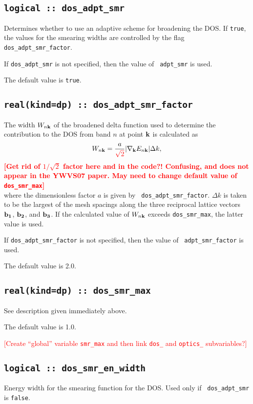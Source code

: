 \subsection[dos\_adpt\_smr]{\tt logical :: dos\_adpt\_smr}
Determines whether to use an adaptive scheme for broadening the
DOS. If \verb#true#, the values for the smearing widths are 
controlled by the flag {\tt dos\_adpt\_smr\_factor}.

If {\tt dos\_adpt\_smr} is not specified, then the value of {\tt
  adpt\_smr} is used.  

The default value is \verb#true#.


\subsection[dos\_adpt\_smr\_factor]{\tt real(kind=dp) :: dos\_adpt\_smr\_factor}

The width $W_{n{\bf k}}$ of the broadened delta function used to
determine the contribution to the DOS from band $n$ at point ${\bf k}$
is calculated as
%
$$
W_{n{\bf k}}=\frac{a}{\textcolor{red}{\sqrt{2}}}\vert
\nabla_{\bf k} E_{n{\bf k}}\vert \Delta k,
$$ 
%
\textcolor{red}{{\bf [Get rid of $1/\sqrt{2}$ factor here and in the code?! 
Confusing, and does not appear in the YWVS07 paper. May need to change default value of
{\tt dos\_smr\_max}]}}\\
where the dimensionless factor $a$ is given by {\tt
  dos\_adpt\_smr\_factor}. $\Delta k$ is taken to be the largest of
the mesh spacings along the three reciprocal lattice vectors ${\bf
  b_1}$, ${\bf b_2}$, and ${\bf b_3}$.  If the calculated value of
$W_{n{\bf k}}$ exceeds {\tt dos\_smr\_max}, the latter
value is used.

If {\tt dos\_adpt\_smr\_factor} is not specified, then the value of {\tt
  adpt\_smr\_factor} is used.  

The default value is 2.0.


\subsection[dos\_smr\_max]{\tt real(kind=dp) ::
  dos\_smr\_max}

See description given immediately above.

The default value is 1.0.

\textcolor{red}{[Create ``global'' variable {\tt smr\_max} and then link
{\tt dos\_} and {\tt optics\_} subvariables?]}

\subsection[dos\_smr\_en\_width]{\tt logical :: dos\_smr\_en\_width}
Energy width for the smearing function for the DOS. Used only if {\tt
  dos\_adpt\_smr} is \verb#false#.


